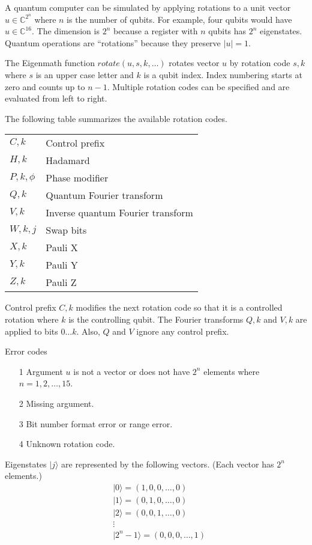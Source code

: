 A quantum computer can be simulated by applying rotations to a
unit vector
$u\in\mathbb{C}^{2^n}$ where $n$ is the number of qubits.
For example, four qubits would have $u\in\mathbb{C}^{16}$.
The dimension is $2^n$ because a register with $n$ qubits
has $2^n$ eigenstates.
Quantum operations are ``rotations'' because they preserve $|u|=1$.

\bigskip
\noindent
The Eigenmath function
$rotate(u,s,k,\ldots)$ rotates vector $u$ by rotation code
$s,k$ where $s$ is an upper case letter and $k$ is a qubit index.
Index numbering starts at zero and counts up to $n-1$.
Multiple rotation codes can be specified
and are evaluated from left to right.

\bigskip
\noindent
The following table summarizes the available rotation codes.

\begin{center}
\begin{tabular}{ll}
$C,k$ & Control prefix
\\
$H,k$ & Hadamard
\\
$P,k,\phi$ & Phase modifier
\\
$Q,k$ & Quantum Fourier transform
\\
$V,k$ & Inverse quantum Fourier transform
\\
$W,k,j$ & Swap bits
\\
$X,k$ & Pauli X
\\
$Y,k$ & Pauli Y
\\
$Z,k$ & Pauli Z
\end{tabular}
\end{center}

\noindent
Control prefix $C,k$ modifies the next rotation code so that it
is a controlled rotation where $k$ is the controlling qubit.
The Fourier transforms $Q,k$ and $V,k$ are applied to bits $0\ldots k$.
Also, $Q$ and $V$ ignore any control prefix.

\bigskip
\noindent
Error codes
\begin{itemize}
\item[1] Argument $u$ is not a vector or does not have $2^n$ elements where $n=1,2,\ldots,15$.
\item[2] Missing argument.
\item[3] Bit number format error or range error.
\item[4] Unknown rotation code.
\end{itemize}

\bigskip
\noindent
Eigenstates $|j\rangle$ are represented by the following vectors.
(Each vector has $2^n$ elements.)
\begin{align*}
&|0\rangle=(1,0,0,\dots,0)
\\
&|1\rangle=(0,1,0,\ldots,0)
\\
&|2\rangle=(0,0,1,\ldots,0)
\\
&\vdots
\\
&|2^n-1\rangle=(0,0,0,\ldots,1)
\end{align*}

